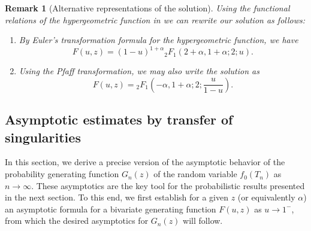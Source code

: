\documentclass[11pt,a4paper]{article}
\numberwithin{equation}{section}
\newtheorem {remark}[theorem]{Remark}
\begin{document}
\begin{remark}[Alternative representations of the solution]
    Using the functional relations of the hypergeometric function in \cite[Sec.\ 5.2.1]{Temme} we can rewrite our solution as follows:

    \begin{enumerate}
        \item By Euler's transformation formula for the hypergeometric function, we have
    \begin{equation*}
        F(u,z) 
        = (1-u)^{1+\alpha} {_2F_1}(2+\alpha,1+\alpha;2;u).
    \end{equation*}

    \item Using the Pfaff transformation, we may also write the solution as
    \begin{equation*}
        F(u,z) = {_2F_1}\left(-\alpha,1+\alpha;2;\frac{u}{1-u}\right).
    \end{equation*}
     
    \end{enumerate}
\end{remark}

\subsection{Asymptotic estimates by transfer of singularities}

In this section, we derive a precise version of the asymptotic behavior of the probability generating function $G_n(z)$ of the random variable $f_0(T_n)$ as $n\to\infty$. These asymptotics are the key tool for the probabilistic results presented in the next section. To this end, we first establish for a given $z$ (or equivalently $\alpha$) an asymptotic formula for a bivariate generating function $F(u,z)$ as $u\to 1^-$, from which the desired asymptotics for $G_n(z)$ will follow.
\end{document}
